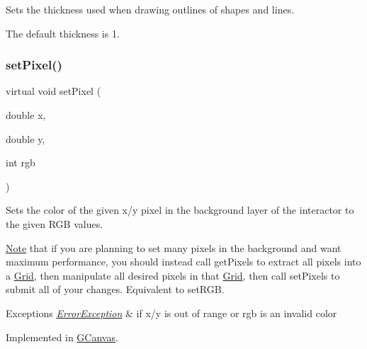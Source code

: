 Sets the thickness used when drawing outlines of shapes and lines. 

The default thickness is 1. \mbox{\label{classGDrawingSurface_ac9f0a75ccb0abe1123046bab56479b84}} 
\subsubsection{\texorpdfstring{set\+Pixel()}{setPixel()}\hspace{0.1cm}{\footnotesize\ttfamily [1/3]}}
{\footnotesize\ttfamily virtual void set\+Pixel (\begin{DoxyParamCaption}\item[{double}]{x,  }\item[{double}]{y,  }\item[{int}]{rgb }\end{DoxyParamCaption})\hspace{0.3cm}{\ttfamily [pure virtual]}}



Sets the color of the given x/y pixel in the background layer of the interactor to the given R\+GB values. 

\mbox{\hyperlink{classNote}{Note}} that if you are planning to set many pixels in the background and want maximum performance, you should instead call get\+Pixels to extract all pixels into a \mbox{\hyperlink{classGrid}{Grid}}, then manipulate all desired pixels in that \mbox{\hyperlink{classGrid}{Grid}}, then call set\+Pixels to submit all of your changes. Equivalent to set\+R\+GB.


\begin{DoxyExceptions}{Exceptions}
{\em \mbox{\hyperlink{classErrorException}{Error\+Exception}}} & if x/y is out of range or rgb is an invalid color \\
\hline
\end{DoxyExceptions}


Implemented in \mbox{\hyperlink{classGCanvas_a1fd61df1d79ebf3db7935d5c38c222e5}{G\+Canvas}}.

\mbox{\label{classGDrawingSurface_aec90e927c9da286214908d3f9da685d7}} 
